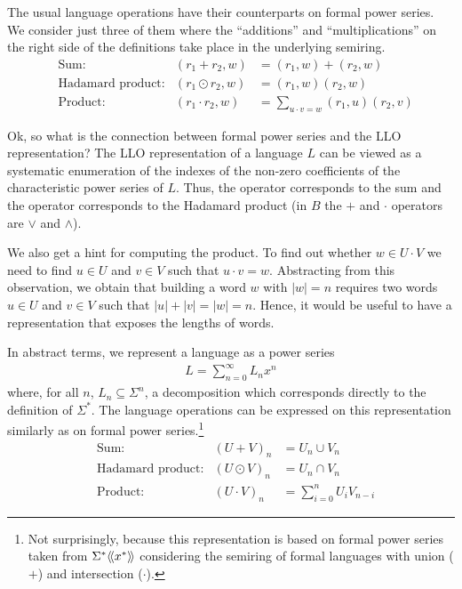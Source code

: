 The usual language operations have their counterparts on formal power
series. We consider just three of them where the ``additions'' and ``multiplications'' on the
right side of the definitions take place in the underlying semiring.
\begin{align*}
  &\text{Sum:}
  & (r_1 + r_2, w) &= (r_1, w) + (r_2, w) \\
  &\text{Hadamard product:}
  &(r_1 \odot r_2, w) &= (r_1, w) (r_2, w) \\
  &\text{Product:}
  & (r_1 \cdot r_2, w) &= \sum_{u\cdot v=w} (r_1, u) (r_2,v) 
\end{align*}

Ok, so what is the connection between formal power series and the LLO
representation? The LLO representation of a language $L$ can be viewed as a systematic
enumeration of the indexes of the non-zero coefficients of the
characteristic power series of $L$. Thus, the  operator
corresponds to the sum and the  operator corresponds
to the Hadamard product (in $B$ the $+$ and $\cdot$ operators are
$\vee$ and $\wedge$). 

We also get a hint for computing the product. To find out whether $w
\in U \cdot V$ we need to find $u\in U$ and $v\in V$ such that $u\cdot
v = w$. Abstracting from this observation, we obtain that building a
word $w$ with $|w| = n$ requires two words $u\in U$ and $v\in V$ such that $|u| +
|v| = |w| = n$. Hence, it would be useful to have a representation
that exposes the lengths of words.

In abstract terms, we represent a language as a power series
\begin{gather*}
  L = \sum_{n=0}^\infty L_nx^n
\end{gather*}
where, for all $n$, $L_n \subseteq \Sigma^n$, a decomposition which corresponds
directly to the definition of $\Sigma^*$. The language operations can
be expressed on this representation similarly as on formal power
series.\footnote{Not surprisingly, because this representation is
  based on formal power series taken from $\FPS[x]{\Sigma^*}$
  considering the semiring of formal languages with union ($+$)
  and intersection ($\cdot$).}
\begin{align}
  &\text{Sum:}
  & (U + V)_n &= U_n \cup V_n \\
  &\text{Hadamard product:}
  & (U \odot V)_n &= U_n \cap V_n \\
  \label{eq:1}
  &\text{Product:}
  & (U \cdot V)_n &= \sum_{i=0}^n U_i V_{n-i}
\end{align}

